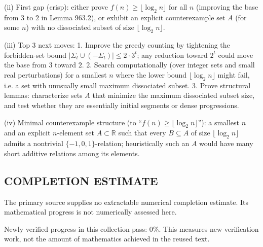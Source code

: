 (ii) First gap (crisp): either prove $f(n)\ge \lfloor\log_2 n\rfloor$ for all $n$ (improving the base from $3$ to $2$ in Lemma 963.2), or exhibit an explicit counterexample set $A$ (for some $n$) with no dissociated subset of size $\lfloor\log_2 n\rfloor$.

(iii) Top 3 next moves:
1. Improve the greedy counting by tightening the forbidden-set bound $|\Sigma_t\cup(-\Sigma_t)|\le 2\cdot 3^t$; any reduction toward $2^t$ could move the base from $3$ toward $2$.
2. Search computationally (over integer sets and small real perturbations) for a smallest $n$ where the lower bound $\lfloor\log_2 n\rfloor$ might fail, i.e. a set with unusually small maximum dissociated subset.
3. Prove structural lemmas: characterize sets $A$ that minimize the maximum dissociated subset size, and test whether they are essentially initial segments or dense progressions.

(iv) Minimal counterexample structure (to “$f(n)\ge \lfloor\log_2 n\rfloor$”): a smallest $n$ and an explicit $n$-element set $A\subset\mathbb R$ such that every $B\subseteq A$ of size $\lfloor\log_2 n\rfloor$ admits a nontrivial $\{-1,0,1\}$-relation; heuristically such an $A$ would have many short additive relations among its elements.




\subsection*{COMPLETION ESTIMATE}
The primary source supplies no extractable numerical completion estimate. Its mathematical progress is not numerically assessed here.

Newly verified progress in this collection pass: $0\%$. This measures new verification work, not the amount of mathematics achieved in the reused text.
